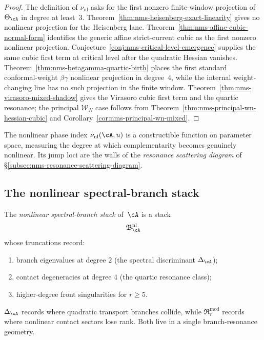 \begin{proof}
The definition of $\nu_{\mathrm{nl}}$ asks for the first nonzero
finite-window projection of~$\Theta_{\cA}$ in degree at least~$3$.
Theorem~\ref{thm:nms-heisenberg-exact-linearity} gives no nonlinear
projection for the Heisenberg lane. Theorem~\ref{thm:nms-affine-cubic-normal-form}
identifies the generic affine strict-current cubic as the first
nonzero nonlinear projection. Conjecture~\ref{conj:nms-critical-level-emergence}
supplies the same cubic first term at critical level after the
quadratic Hessian vanishes. Theorem~\ref{thm:nms-betagamma-quartic-birth}
places the first standard conformal-weight $\beta\gamma$ nonlinear
projection in degree~$4$, while the internal weight-changing line has
no such projection in the finite window. Theorem~\ref{thm:nms-virasoro-mixed-shadow}
gives the Virasoro cubic first term and the quartic resonance; the
principal $\mathcal W_N$ case follows from
Theorem~\ref{thm:nms-principal-wn-hessian-cubic} and
Corollary~\ref{cor:nms-principal-wn-mixed}.
\end{proof}

\begin{remark}
\label{rem:nms-phase-wall-crossing}
The nonlinear phase index $\nu_{\mathrm{nl}}(\cA,u)$ is a constructible function on parameter space, measuring the degree at which complementarity becomes genuinely nonlinear. Its jump loci are the walls of the \emph{resonance scattering diagram} of \S\ref{subsec:nms-resonance-scattering-diagram}.
\end{remark}

\subsection{The nonlinear spectral-branch stack}
\label{subsec:nms-nonlinear-branch-stack}

\begin{definition}
\label{def:nms-nonlinear-branch-stack}
%
The \emph{nonlinear spectral-branch stack} of~$\cA$ is a stack
\[
\mathfrak B_{\cA}^{\mathrm{nl}}
\]
whose truncations record:
\begin{enumerate}[label=\textup{(\roman*)}]
\item branch eigenvalues at degree $2$ (the spectral discriminant $\Delta_{\cA}$);
\item contact degeneracies at degree $4$ (the quartic resonance class);
\item higher-degree front singularities for $r\ge 5$.
\end{enumerate}
$\Delta_{\cA}$ records where quadratic transport branches collide, while $\mathfrak R^{\mathrm{mod}}_{r}$ records where nonlinear contact sectors lose rank. Both live in a single branch-resonance geometry.
\end{definition}

